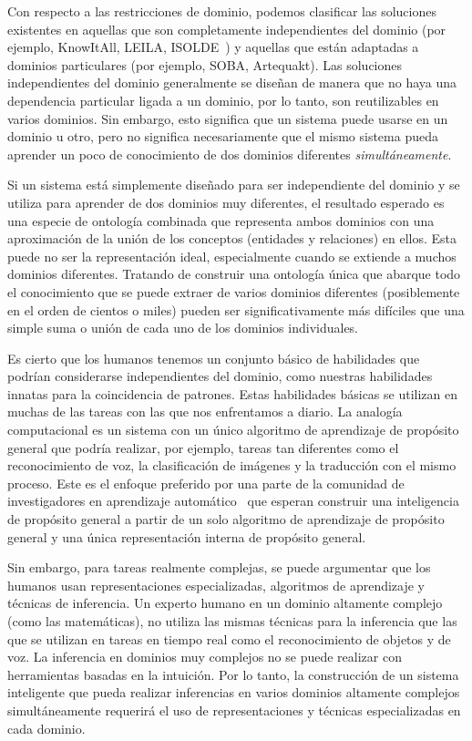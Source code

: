 Con respecto a las restricciones de dominio, podemos clasificar las soluciones existentes en aquellas que son completamente independientes del dominio (por ejemplo, KnowItAll, LEILA, ISOLDE~\cite{isolde}) y aquellas que están adaptadas a dominios particulares (por ejemplo, SOBA, Artequakt).
Las soluciones independientes del dominio generalmente se diseñan de manera que no haya una dependencia particular ligada a un dominio, por lo tanto, son reutilizables en varios dominios.
Sin embargo, esto significa que un sistema puede usarse en un dominio u otro, pero no significa necesariamente que el mismo sistema pueda aprender un poco de conocimiento de dos dominios diferentes \emph{simultáneamente}.

Si un sistema está simplemente diseñado para ser independiente del dominio y se utiliza para aprender de dos dominios muy diferentes, el resultado esperado es una especie de ontología combinada que representa ambos dominios con una aproximación de la unión de los conceptos (entidades y relaciones) en ellos.
Esta puede no ser la representación ideal, especialmente cuando se extiende a muchos dominios diferentes.
Tratando de construir una ontología única que abarque todo el conocimiento que se puede extraer de varios dominios diferentes (posiblemente en el orden de cientos o miles) pueden ser significativamente más difíciles que una simple suma o unión de cada uno de los dominios individuales.

Es cierto que los humanos tenemos un conjunto básico de habilidades que podrían considerarse independientes del dominio, como nuestras habilidades innatas para la coincidencia de patrones.
Estas habilidades básicas se utilizan en muchas de las tareas con las que nos enfrentamos a diario.
La analogía computacional es un sistema con un único algoritmo de aprendizaje de propósito general que podría realizar, por ejemplo, tareas tan diferentes como el reconocimiento de voz, la clasificación de imágenes y la traducción con el mismo proceso.
Este es el enfoque preferido por una parte de la comunidad de investigadores en aprendizaje automático~\cite{kaiser2017one} que esperan construir una inteligencia de propósito general a partir de un solo algoritmo de aprendizaje de propósito general y una única representación interna de propósito general.

Sin embargo, para tareas realmente complejas, se puede argumentar que los humanos usan representaciones especializadas, algoritmos de aprendizaje y técnicas de inferencia.
Un experto humano en un dominio altamente complejo (como las matemáticas), no utiliza las mismas técnicas para la inferencia que las que se utilizan en tareas en tiempo real como el reconocimiento de objetos y de voz.
La inferencia en dominios muy complejos no se puede realizar con herramientas basadas en la intuición.
Por lo tanto, la construcción de un sistema inteligente que pueda realizar inferencias en varios dominios altamente complejos simultáneamente requerirá el uso de representaciones y técnicas especializadas en cada dominio.

